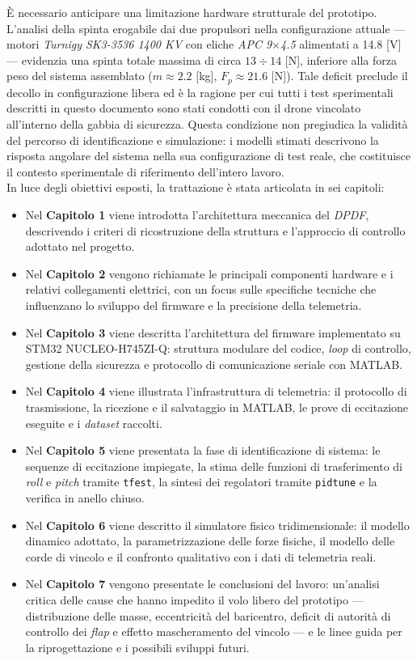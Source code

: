 \documentclass[11pt]{report}
\begin{document}
	È necessario anticipare una limitazione hardware strutturale del prototipo. L'analisi della spinta erogabile dai due propulsori nella configurazione attuale --- motori \textit{Turnigy SK3-3536 1400 KV} con eliche \textit{APC 9$\times$4.5} alimentati a 14.8 [V] --- evidenzia una spinta totale massima di circa $13 \div 14$ [N], inferiore alla forza peso del sistema assemblato ($m \approx 2.2$ [kg], $F_p \approx 21.6$ [N]). Tale deficit preclude il decollo in configurazione libera ed è la ragione per cui tutti i test sperimentali descritti in questo documento sono stati condotti con il drone vincolato all'interno della gabbia di sicurezza. Questa condizione non pregiudica la validità del percorso di identificazione e simulazione: i modelli stimati descrivono la risposta angolare del sistema nella sua configurazione di test reale, che costituisce il contesto sperimentale di riferimento dell'intero lavoro.\\
	In luce degli obiettivi esposti, la trattazione è stata articolata in sei capitoli:
	\begin{itemize}
		\item Nel \textbf{Capitolo 1} viene introdotta l'architettura meccanica del \textit{DPDF}, descrivendo i criteri di ricostruzione della struttura e l'approccio di controllo adottato nel progetto.
		\item Nel \textbf{Capitolo 2} vengono richiamate le principali componenti hardware e i relativi collegamenti elettrici, con un focus sulle specifiche tecniche che influenzano lo sviluppo del firmware e la precisione della telemetria.
		\item Nel \textbf{Capitolo 3} viene descritta l'architettura del firmware implementato su STM32 NUCLEO-H745ZI-Q: struttura modulare del codice, \textit{loop} di controllo, gestione della sicurezza e protocollo di comunicazione seriale con MATLAB.
		\item Nel \textbf{Capitolo 4} viene illustrata l'infrastruttura di telemetria: il protocollo di trasmissione, la ricezione e il salvataggio in MATLAB, le prove di eccitazione eseguite e i \textit{dataset} raccolti.
		\item Nel \textbf{Capitolo 5} viene presentata la fase di identificazione di sistema: le sequenze di eccitazione impiegate, la stima delle funzioni di trasferimento di \textit{roll} e \textit{pitch} tramite \texttt{tfest}, la sintesi dei regolatori tramite \texttt{pidtune} e la verifica in anello chiuso.
		\item Nel \textbf{Capitolo 6} viene descritto il simulatore fisico tridimensionale: il modello dinamico adottato, la parametrizzazione delle forze fisiche, il modello delle corde di vincolo e il confronto qualitativo con i dati di telemetria reali.
        \item Nel \textbf{Capitolo 7} vengono presentate le conclusioni del lavoro: un'analisi critica delle cause che hanno impedito il volo libero del prototipo --- distribuzione delle masse, eccentricità del baricentro, deficit di autorità di controllo dei \textit{flap} e effetto mascheramento del vincolo --- e le linee guida per la riprogettazione e i possibili sviluppi futuri.
	\end{itemize}
	\newpage
	
\end{document}
